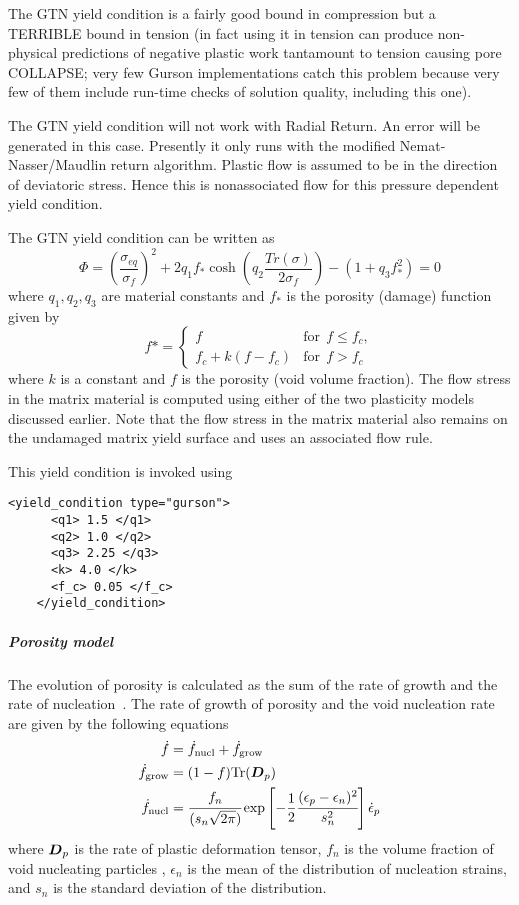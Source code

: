   The GTN yield condition is a fairly good bound in compression but a
  TERRIBLE bound in tension (in fact using it in tension can produce
  non-physical predictions of negative plastic work tantamount to
  tension causing pore COLLAPSE; very few Gurson implementations catch
  this problem because very few of them include run-time checks of
  solution quality, including this one).

  The GTN yield condition will not work with Radial Return.  An error
  will be generated in this case.  Presently it only runs with the
  modified Nemat-Nasser/Maudlin return algorithm.  Plastic flow is
  assumed to be in the direction of deviatoric stress.  Hence this
  is nonassociated flow for this pressure dependent yield condition.

  The GTN yield condition can be written as
  \begin{equation}
    \Phi = \left(\frac{\sigma_{eq}}{\sigma_f}\right)^2 +
    2 q_1 f_* \cosh \left(q_2 \frac{Tr(\sigma)}{2\sigma_f}\right) -
    (1+q_3 f_*^2) = 0
  \end{equation}
  where $q_1,q_2,q_3$ are material constants and $f_*$ is the porosity
  (damage) function given by
  \begin{equation}
    f* = 
    \begin{cases}
      f & \text{for}~~ f \le f_c,\\ 
      f_c + k (f - f_c) & \text{for}~~ f > f_c 
    \end{cases}
  \end{equation}
  where $k$ is a constant and $f$ is the porosity (void volume fraction).  The
  flow stress in the matrix material is computed using either of the two
  plasticity models discussed earlier.  Note that the flow stress in the matrix
  material also remains on the undamaged matrix yield surface and uses an
  associated flow rule.

  This yield condition is invoked using
  \begin{Verbatim}[fontsize=\footnotesize]
    <yield_condition type="gurson">
      <q1> 1.5 </q1>
      <q2> 1.0 </q2>
      <q3> 2.25 </q3>
      <k> 4.0 </k>
      <f_c> 0.05 </f_c>
    </yield_condition>
  \end{Verbatim}

  \subparagraph{Porosity model}
  The evolution of porosity is calculated as the sum of the rate of growth
  and the rate of nucleation~\cite{Ramaswamy98a}.  The rate of growth of
  porosity and the void nucleation rate are given by the following equations
  ~\cite{Chu80}
  \begin{align}
    \dot{f} &= \dot{f}_{\text{nucl}} + \dot{f}_{\text{grow}} \\
    \dot{f}_{\text{grow}} & = (1-f) \text{Tr}(\BD_p) \\
    \dot{f}_{\text{nucl}} & = \cfrac{f_n}{(s_n \sqrt{2\pi})}
            \exp\left[-\Half \cfrac{(\epsilon_p - \epsilon_n)^2}{s_n^2}\right]
            \dot{\epsilon}_p
  \end{align}
  where $\BD_p$ is the rate of plastic deformation tensor, $f_n$ is the volume
  fraction of void nucleating particles , $\epsilon_n$ is the mean of the
  distribution of nucleation strains, and $s_n$ is the standard
  deviation of the distribution.

